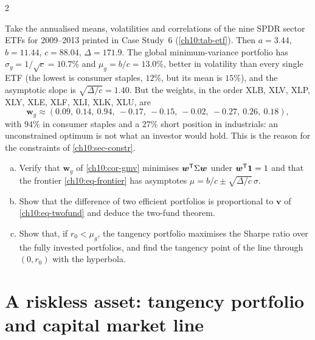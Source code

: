 \begin{paracol}{2}
\begin{example}\label{ch10:ex-etf-unc}
Take the annualised means, volatilities and correlations of the nine SPDR sector ETFs for 2009--2013 printed in
Case Study~6 (\cref{ch10:tab-etf}). Then $a=3.44$, $b=11.44$, $c=88.04$, $\Delta=171.9$. The global minimum-variance
portfolio has $\sigma_g=1/\sqrt c=10.7\%$ and $\mu_g=b/c=13.0\%$, better in volatility than every single ETF
(the lowest is consumer staples, $12\%$, but its mean is $15\%$), and the asymptotic slope is
$\sqrt{\Delta/c}=1.40$. But the weights, in the order XLB, XLV, XLP, XLY, XLE, XLF, XLI, XLK, XLU, are
\[
  \bm w_g\approx(0.09,\ 0.14,\ 0.94,\ -0.17,\ -0.15,\ -0.02,\ -0.27,\ 0.26,\ 0.18),
\]
with $94\%$ in consumer staples and a $27\%$ short position in industrials: an unconstrained optimum is not
what an investor would hold. This is the reason for the constraints of \cref{ch10:sec-constr}.
\end{example}

\begin{exercise}
\leavevmode
\begin{enumerate}[(a)]
  \item Verify that $\bm w_g$ of \cref{ch10:cor-gmv} minimises $\bm w^{\mathsf T}\Sigma\bm w$ under $\bm w^{\mathsf T}\bm 1=1$ and that the frontier
      \eqref{ch10:eq-frontier} has asymptotes $\mu=b/c\pm\sqrt{\Delta/c}\,\sigma$.
  \item Show that the difference of two efficient portfolios is proportional to $\bm v$ of
      \eqref{ch10:eq-twofund} and deduce the two-fund theorem.
  \item Show that, if $r_0<\mu_g$, the tangency portfolio maximises the
      Sharpe ratio over the fully invested portfolios, and find the tangency point of the line through $(0,r_0)$ with the hyperbola.
\end{enumerate}
\end{exercise}

\section{A riskless asset: tangency portfolio and capital market line}\label{ch10:sec-rf}


\end{paracol}
